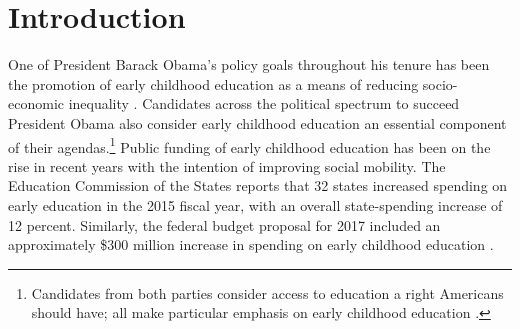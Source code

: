 \singlespacing
\tableofcontents
\listoffigures
\listoftables
\doublespacing

\section{Introduction}

\noindent One of President Barack Obama's policy goals throughout his tenure has been the promotion of early childhood education as a means of reducing socio-economic inequality \citep{Bajaj_Labaton_2009_ObamaRiskAssets,White_House_2014_Econ_of_EC_Investments,White_House_2014_Fact_Sheet_Press}. Candidates across the political spectrum to succeed President Obama also consider early childhood education an essential component of their agendas.\footnote{Candidates from both parties consider access to education a right Americans should have; all make particular emphasis on early childhood education \citep{Hillary-for-Am_2016_Universal-Preschool,On-the-Issues_2016_Sanders-on-Families,On-the-Issues_2016_Cruz-on-Education}.} Public funding of early childhood education has been on the rise in recent years with the intention of improving social mobility. The Education Commission of the States reports that 32 states increased spending on early education in the 2015 fiscal year, with an overall state-spending increase of 12 percent. Similarly, the federal budget proposal for 2017 included an approximately \$300 million increase in spending on early childhood education \citep{US-Gov_2016_Budget,Parker-etal_2016_50-State-Review,Smith_2016_Early-Learning-Budget}.\\

